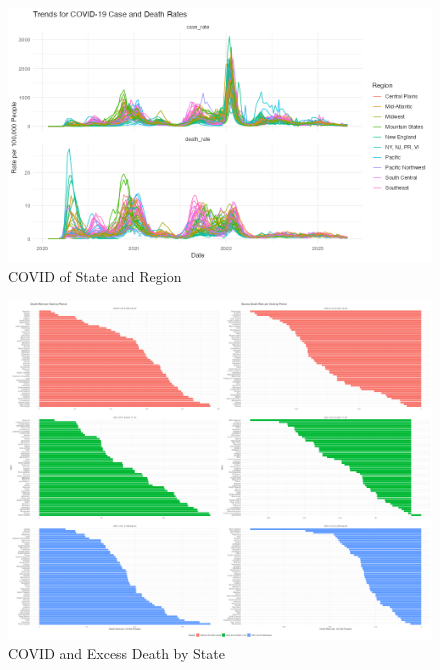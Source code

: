 \documentclass[
  letterpaper,
  DIV=11,
  numbers=noendperiod]{scrartcl}
\begin{document}
\begin{figure}[H]

{\centering \includegraphics{../docs/covid_state_region.png}

}

\caption{COVID of State and Region}

\end{figure}%
\begin{figure}[H]

{\centering \includegraphics{images/excess_death_by_state.png}

}

\caption{COVID and Excess Death by State}

\end{figure}%
\end{document}
